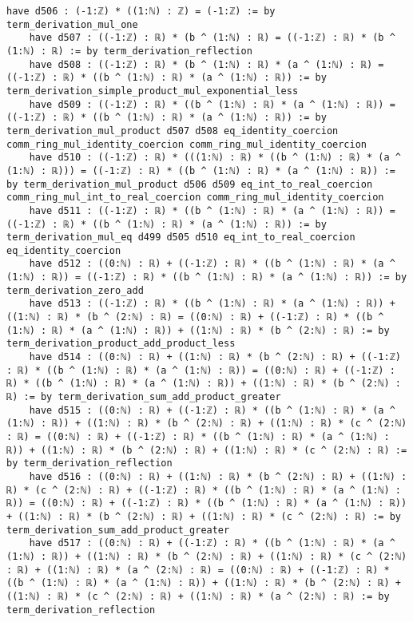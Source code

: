 \documentclass{article}
\begin{document}
\begin{tcolorbox}[colback=white!10, width=\linewidth]
\begin{lstlisting}[language=Lean4]
    have d506 : (-1:ℤ) * ((1:ℕ) : ℤ) = (-1:ℤ) := by term_derivation_mul_one
    have d507 : ((-1:ℤ) : ℝ) * (b ^ (1:ℕ) : ℝ) = ((-1:ℤ) : ℝ) * (b ^ (1:ℕ) : ℝ) := by term_derivation_reflection
    have d508 : ((-1:ℤ) : ℝ) * (b ^ (1:ℕ) : ℝ) * (a ^ (1:ℕ) : ℝ) = ((-1:ℤ) : ℝ) * ((b ^ (1:ℕ) : ℝ) * (a ^ (1:ℕ) : ℝ)) := by term_derivation_simple_product_mul_exponential_less
    have d509 : ((-1:ℤ) : ℝ) * ((b ^ (1:ℕ) : ℝ) * (a ^ (1:ℕ) : ℝ)) = ((-1:ℤ) : ℝ) * ((b ^ (1:ℕ) : ℝ) * (a ^ (1:ℕ) : ℝ)) := by term_derivation_mul_product d507 d508 eq_identity_coercion comm_ring_mul_identity_coercion comm_ring_mul_identity_coercion
    have d510 : ((-1:ℤ) : ℝ) * (((1:ℕ) : ℝ) * ((b ^ (1:ℕ) : ℝ) * (a ^ (1:ℕ) : ℝ))) = ((-1:ℤ) : ℝ) * ((b ^ (1:ℕ) : ℝ) * (a ^ (1:ℕ) : ℝ)) := by term_derivation_mul_product d506 d509 eq_int_to_real_coercion comm_ring_mul_int_to_real_coercion comm_ring_mul_identity_coercion
    have d511 : ((-1:ℤ) : ℝ) * ((b ^ (1:ℕ) : ℝ) * (a ^ (1:ℕ) : ℝ)) = ((-1:ℤ) : ℝ) * ((b ^ (1:ℕ) : ℝ) * (a ^ (1:ℕ) : ℝ)) := by term_derivation_mul_eq d499 d505 d510 eq_int_to_real_coercion eq_identity_coercion
    have d512 : ((0:ℕ) : ℝ) + ((-1:ℤ) : ℝ) * ((b ^ (1:ℕ) : ℝ) * (a ^ (1:ℕ) : ℝ)) = ((-1:ℤ) : ℝ) * ((b ^ (1:ℕ) : ℝ) * (a ^ (1:ℕ) : ℝ)) := by term_derivation_zero_add
    have d513 : ((-1:ℤ) : ℝ) * ((b ^ (1:ℕ) : ℝ) * (a ^ (1:ℕ) : ℝ)) + ((1:ℕ) : ℝ) * (b ^ (2:ℕ) : ℝ) = ((0:ℕ) : ℝ) + ((-1:ℤ) : ℝ) * ((b ^ (1:ℕ) : ℝ) * (a ^ (1:ℕ) : ℝ)) + ((1:ℕ) : ℝ) * (b ^ (2:ℕ) : ℝ) := by term_derivation_product_add_product_less
    have d514 : ((0:ℕ) : ℝ) + ((1:ℕ) : ℝ) * (b ^ (2:ℕ) : ℝ) + ((-1:ℤ) : ℝ) * ((b ^ (1:ℕ) : ℝ) * (a ^ (1:ℕ) : ℝ)) = ((0:ℕ) : ℝ) + ((-1:ℤ) : ℝ) * ((b ^ (1:ℕ) : ℝ) * (a ^ (1:ℕ) : ℝ)) + ((1:ℕ) : ℝ) * (b ^ (2:ℕ) : ℝ) := by term_derivation_sum_add_product_greater
    have d515 : ((0:ℕ) : ℝ) + ((-1:ℤ) : ℝ) * ((b ^ (1:ℕ) : ℝ) * (a ^ (1:ℕ) : ℝ)) + ((1:ℕ) : ℝ) * (b ^ (2:ℕ) : ℝ) + ((1:ℕ) : ℝ) * (c ^ (2:ℕ) : ℝ) = ((0:ℕ) : ℝ) + ((-1:ℤ) : ℝ) * ((b ^ (1:ℕ) : ℝ) * (a ^ (1:ℕ) : ℝ)) + ((1:ℕ) : ℝ) * (b ^ (2:ℕ) : ℝ) + ((1:ℕ) : ℝ) * (c ^ (2:ℕ) : ℝ) := by term_derivation_reflection
    have d516 : ((0:ℕ) : ℝ) + ((1:ℕ) : ℝ) * (b ^ (2:ℕ) : ℝ) + ((1:ℕ) : ℝ) * (c ^ (2:ℕ) : ℝ) + ((-1:ℤ) : ℝ) * ((b ^ (1:ℕ) : ℝ) * (a ^ (1:ℕ) : ℝ)) = ((0:ℕ) : ℝ) + ((-1:ℤ) : ℝ) * ((b ^ (1:ℕ) : ℝ) * (a ^ (1:ℕ) : ℝ)) + ((1:ℕ) : ℝ) * (b ^ (2:ℕ) : ℝ) + ((1:ℕ) : ℝ) * (c ^ (2:ℕ) : ℝ) := by term_derivation_sum_add_product_greater
    have d517 : ((0:ℕ) : ℝ) + ((-1:ℤ) : ℝ) * ((b ^ (1:ℕ) : ℝ) * (a ^ (1:ℕ) : ℝ)) + ((1:ℕ) : ℝ) * (b ^ (2:ℕ) : ℝ) + ((1:ℕ) : ℝ) * (c ^ (2:ℕ) : ℝ) + ((1:ℕ) : ℝ) * (a ^ (2:ℕ) : ℝ) = ((0:ℕ) : ℝ) + ((-1:ℤ) : ℝ) * ((b ^ (1:ℕ) : ℝ) * (a ^ (1:ℕ) : ℝ)) + ((1:ℕ) : ℝ) * (b ^ (2:ℕ) : ℝ) + ((1:ℕ) : ℝ) * (c ^ (2:ℕ) : ℝ) + ((1:ℕ) : ℝ) * (a ^ (2:ℕ) : ℝ) := by term_derivation_reflection

\end{lstlisting}
\end{tcolorbox}
\end{document}
